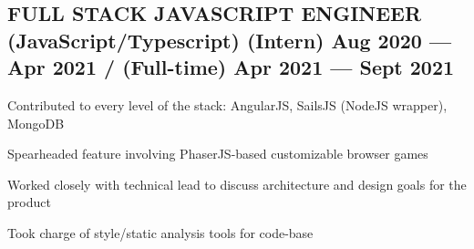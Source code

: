 \documentclass[letter,10pt]{article}
\begin{document}
\subsection{{FULL STACK JAVASCRIPT ENGINEER (JavaScript/Typescript) \texorpdfstring{\hfill}{\space} (Intern) Aug 2020 --- Apr 2021 / (Full-time) Apr 2021 --- Sept 2021}}
\begin{zitemize}
    \item Contributed to every level of the stack: AngularJS, SailsJS (NodeJS wrapper), MongoDB
    \item Spearheaded feature involving PhaserJS-based customizable browser games
    \item Worked closely with technical lead to discuss architecture and design goals for the product
    \item Took charge of style/static analysis tools for code-base
\end{zitemize}
\end{document}
